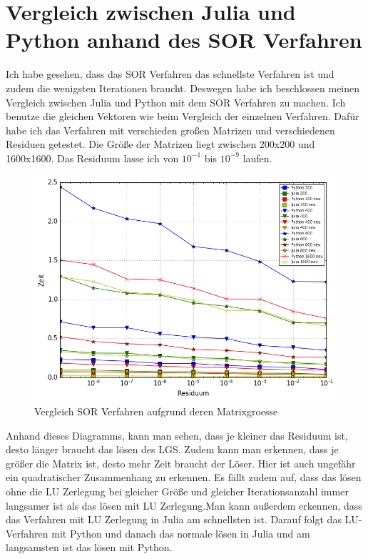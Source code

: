 \documentclass[a4paper, 11pt]{article}
\begin{document}
\newpage

\section{Vergleich zwischen Julia und Python anhand des SOR Verfahren}
Ich habe gesehen, dass das SOR Verfahren das schnellste Verfahren ist und zudem die wenigsten Iterationen braucht. Deswegen habe ich beschlossen meinen Vergleich zwischen Julia und Python mit dem SOR Verfahren zu machen. 
Ich benutze die gleichen Vektoren wie beim Vergleich der einzelnen Verfahren.
Daf\"ur habe ich das Verfahren mit verschieden gro\ss{}en Matrizen und verschiedenen Residuen getestet. Die Gr\"o\ss{}e der Matrizen liegt zwischen 200x200 und 1600x1600. Das Residuum lasse ich von \(10^{-1}\) bis \(10^{-9}\) laufen. 
\begin{figure}[h]
	\centering
	\includegraphics[width=1\textwidth]{SORneu.png}
	\caption{Vergleich SOR Verfahren aufgrund deren Matrixgroesse}
	\label{img:Bild2}
\end{figure}
Anhand dieses Diagramms, kann man sehen, dass je kleiner das Residuum ist, desto l\"anger braucht das l\"osen des LGS. Zudem kann man erkennen, dass je gr\"o\ss{}er die Matrix ist, 
desto mehr Zeit braucht der L\"oser. Hier ist auch ungef\"ahr ein quadratischer Zusammenhang zu erkennen. Es f\"allt zudem auf, dass das l\"osen ohne die LU Zerlegung bei gleicher Gr\"o\ss{}e und gleicher Iterationsanzahl 
immer langsamer ist als das l\"osen mit LU Zerlegung.Man kann au\ss{}erdem erkennen, dass das Verfahren mit LU Zerlegung in Julia am schnellsten ist. Darauf folgt das LU-Verfahren mit Python und danach das normale l\"osen in 
Julia und am langsamsten ist das l\"osen mit Python.
\end{document}
